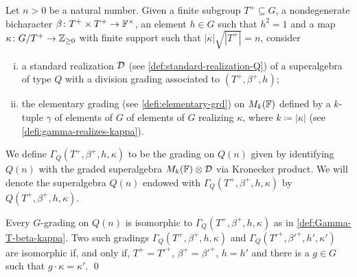 \begin{defi}\label{def:Gamma-T-beta-kappa-Q}
    Let $n > 0$ be a natural number. 
    Given a finite subgroup $T^+ \subseteq G$, a nondegenerate bicharacter $\beta\colon T^+ \times T^+ \to \mathbb{F}^\times$, an element $h\in G$ such that $h^2 = 1$ and a map $\kappa\colon G/T^+ \to \mathbb{Z}_{\geq 0}$ with finite support such that $|\kappa| \sqrt{|T^+|} = n$, consider 
    \begin{enumerate}[(i)]
        \item a standard realization $\mathcal{D}$ (see \cref{def:standard-realization-Q}) of a superalgebra of type $Q$ with a division grading associated to $(T^+, \beta^+, h)$;
        \item the elementary grading (see \cref{defi:elementary-grd}) on $M_{k}(\mathbb{F})$ defined by a $k$-tuple $\gamma$ of elements of $G$  of elements of $G$ realizing $\kappa$, where $k \coloneqq |\kappa|$ (see \cref{defi:gamma-realizes-kappa}).  
    \end{enumerate}
    We define $\Gamma_Q (T^+, \beta^+, h, \kappa)$ to be the grading on $Q(n)$ given by identifying $Q(n)$ with the graded superalgebra $M_k(\mathbb{F}) \otimes \mathcal{D}$ via Kronecker product. 
    We will denote the superalgebra $Q(n)$ endowed with $\Gamma_Q (T^+, \beta^+, h, \kappa)$ by $Q (T^+, \beta^+, h, \kappa)$. 
\end{defi}

\begin{cor}\label{cor:iso-Q}
    Every $G$-grading on $Q(n)$ is isomorphic to $\Gamma_Q (T^+, \beta^+, h, \kappa)$ as in \cref{def:Gamma-T-beta-kappa}. 
    Two such gradings $\Gamma_Q (T^+, \beta^+, h, \kappa)$ and $\Gamma_Q (T'^+, \beta'^+, h', \kappa')$ are isomorphic if, and only if, $T^+ = T'^+$, $\beta^+ = \beta'^+$, $h = h'$ and there is a $g\in G$ such that $g\cdot \kappa = \kappa'$. \qed
\end{cor}